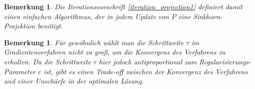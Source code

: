 \documentclass[twoside, 12pt,a4paper]{book}
\newtheorem{remark}[theorem]{Bemerkung}
\numberwithin{equation}{section}
\begin{document}
	\begin{remark}
		Die Iterationsvorschrift \ref{iteration_projection1} definiert damit einen einfachen Algorithmus, der in jedem Update von $P$ eine Sinkhorn-Projektion benötigt.
	\end{remark}

	
	
	\begin{remark}
		Für gewöhnlich wählt man die Schrittweite $ \tau$ im Gradientenverfahren nicht zu groß, um die Konvergenz des Verfahrens zu erhalten. Da die Schrittweite $\tau$ hier jedoch antiproportional zum Regularisierungs-Parameter $\varepsilon$ ist, gibt es einen Trade-off zwischen der Konvergenz des Verfahrens und einer Unschärfe in der optimalen Lösung. 
	\end{remark}

	
	
\end{document}
